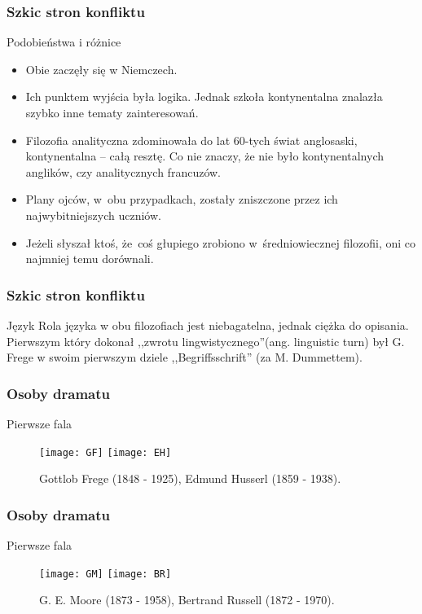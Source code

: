 \begin{frame}
\frametitle{Szkic stron konfliktu}
\begin{block}{Podobieństwa i różnice}
\begin{itemize}
\item Obie zaczęły się w Niemczech.
\item Ich punktem wyjścia była logika. Jednak szkoła kontynentalna znalazła szybko inne tematy zainteresowań.
\item Filozofia analityczna zdominowała do lat 60-tych świat anglosaski, kontynentalna -- całą resztę. Co nie znaczy, że nie było kontynentalnych anglików, czy analitycznych francuzów.
\item Plany ojców, w~obu przypadkach, zostały zniszczone przez ich najwybitniejszych uczniów.
\item Jeżeli słyszał ktoś, że~coś głupiego zrobiono w~średniowiecznej filozofii, oni co najmniej temu dorównali.
\end{itemize}
\end{block}
\end{frame}

\begin{frame}
\frametitle{Szkic stron konfliktu}
\begin{block}{Język}
Rola języka w obu filozofiach jest niebagatelna, jednak ciężka do opisania. Pierwszym który dokonał ,,zwrotu lingwistycznego''\linebreak (ang. linguistic turn) był G. Frege w swoim pierwszym dziele ,,Begriffsschrift'' (za M. Dummettem).
\end{block}
\end{frame}

\begin{frame}
\frametitle{Osoby dramatu}
\begin{block}{Pierwsze fala}
\begin{figure}
\centering
\texttt{[image: GF]}
\texttt{[image: EH]}
\caption{Gottlob Frege  (1848 - 1925), Edmund Husserl (1859 - 1938).}
\end{figure}
\end{block}
\end{frame}

\begin{frame}
\frametitle{Osoby dramatu}
\begin{block}{Pierwsze fala}
\begin{figure}
\centering
\texttt{[image: GM]}
\texttt{[image: BR]}
\caption{G. E. Moore (1873 - 1958), Bertrand Russell (1872 - 1970).}
\end{figure}
\end{block}
\end{frame}

